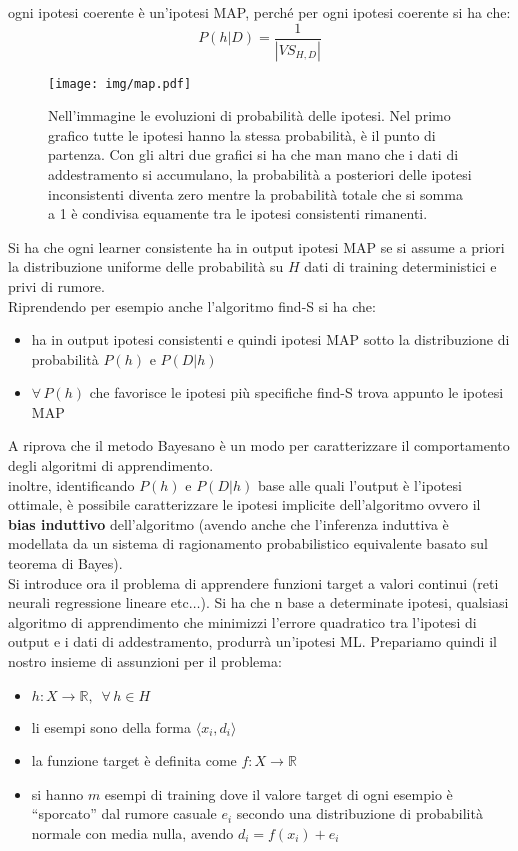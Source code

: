 ogni ipotesi coerente è un'ipotesi MAP, perché per ogni ipotesi coerente si ha
che:
\[P(h|D)=\frac{1}{|VS_{H,D}|}\]
\begin{figure}
  \centering
  \texttt{[image: img/map.pdf]}
  \caption{Nell'immagine le evoluzioni di probabilità delle
    ipotesi. Nel primo grafico tutte le ipotesi hanno la stessa probabilità, è
    il punto di partenza. Con gli altri due grafici si ha che man mano che i
    dati di addestramento si accumulano, la probabilità a posteriori delle
    ipotesi inconsistenti diventa zero mentre la probabilità totale che si somma
    a 1 è condivisa equamente tra le ipotesi consistenti rimanenti.}
\end{figure}
Si ha che ogni learner consistente ha in output ipotesi MAP se si assume a
priori la distribuzione uniforme delle probabilità su $H$ dati di training
deterministici e privi di rumore.\\
Riprendendo per esempio anche l'algoritmo find-S si ha che:
\begin{itemize}
  \item ha in output ipotesi consistenti e quindi ipotesi MAP sotto la
  distribuzione di probabilità $P(h)$ e $P(D|h)$
  \item $\forall\,P(h)$ che favorisce le ipotesi più specifiche find-S trova
  appunto le ipotesi MAP
\end{itemize}
A riprova che il metodo Bayesano è un modo per caratterizzare il comportamento
degli algoritmi di apprendimento.\\
inoltre, identificando $P(h)$ e $P(D|h)$ base alle quali l'output è l'ipotesi
ottimale, è possibile caratterizzare le ipotesi implicite dell'algoritmo ovvero
il \textbf{bias induttivo} dell'algoritmo (avendo anche che l'inferenza
induttiva è modellata da un sistema di ragionamento probabilistico equivalente
basato sul teorema di Bayes). \\
Si introduce ora il problema di apprendere funzioni target a valori continui
(reti neurali regressione lineare etc$\ldots$). Si ha che n base a determinate
ipotesi, qualsiasi algoritmo di apprendimento che minimizzi l'errore quadratico
tra l'ipotesi di output e i dati di addestramento, produrrà un'ipotesi
ML. Prepariamo quindi il nostro insieme di assunzioni per il problema:
\begin{itemize}
  \item $h:X\to\mathbb{R},\,\,\,\forall\,h\in H$
  \item li esempi sono della forma $\langle x_i, d_i\rangle$
  \item la funzione target è definita come $f:X\to\mathbb{R}$
  \item si hanno $m$ esempi di training dove il valore target di ogni esempio è
  ``sporcato'' dal rumore casuale $e_i$ secondo una distribuzione di probabilità
  normale con media nulla, avendo $d_i=f(x_i)+e_i$
\end{itemize}
